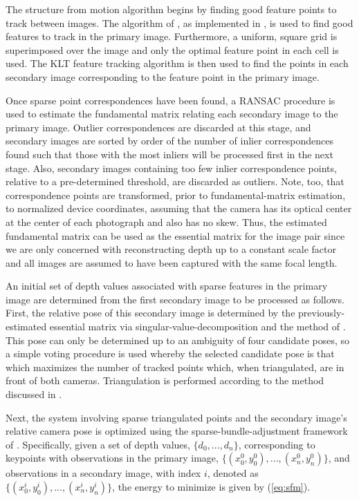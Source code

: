 \documentclass[conference]{acmsiggraph}
\begin{document}
The structure from motion algorithm begins by finding good feature points
to track between images.  The algorithm of \cite{shi1994good}, as implemented
in \cite{opencv_library}, is used to find good features to track in the
primary image.
Furthermore, a uniform, square grid is superimposed over the image and only
the optimal feature point in each cell is used.
The KLT feature tracking algorithm is then used to find the points in each
secondary image corresponding to the feature point in the primary image.

Once sparse point correspondences have been found, a RANSAC procedure
is used to estimate the fundamental matrix relating each secondary
image to the primary image.  Outlier correspondences are discarded at this
stage, and secondary images are sorted by order of the number of inlier
correspondences found such that those with the most inliers will
be processed first in the next stage.  Also, secondary images containing
too few inlier correspondence points, relative to a pre-determined
threshold, are discarded as outliers.  Note, too, that correspondence
points are transformed, prior to fundamental-matrix estimation, to normalized
device coordinates, assuming that the camera has its optical center at the center of each
photograph and also has no skew.  Thus, the estimated fundamental matrix
can be used as the essential matrix for the image pair since
we are only concerned with reconstructing depth up to a constant scale
factor and all images are assumed to have been captured with the
same focal length.

An initial set of depth values associated with sparse features in
the primary image are determined from the first secondary image
to be processed as follows.  First, the relative pose of this secondary
image is determined by the previously-estimated essential matrix via
singular-value-decomposition and the method of \cite{hartley2003multiple}.
This pose can only be determined up to an ambiguity of four candidate poses,
so a simple voting procedure is used whereby the selected candidate pose is
that which maximizes the number of tracked points which, when triangulated,
are in front of both cameras.  Triangulation is performed according to the
method discussed in \cite{hartley1997triangulation}.

Next, the system involving sparse triangulated points and the secondary
image's relative camera pose is optimized using the sparse-bundle-adjustment
framework of \cite{ceres-solver}.  Specifically, given a set of depth values,
$\{d_0, ..., d_n\}$, corresponding to keypoints with observations in the
primary image, $\{(x_0^0, y_0^0), ..., (x_n^0, y_n^0)\}$, and observations
in a secondary image, with index $i$, denoted as
$\{(x_0^i, y_0^i), ..., (x_n^i, y_n^i)\}$, the energy to minimize is
given by (\ref{eq:sfm}).
\end{document}
